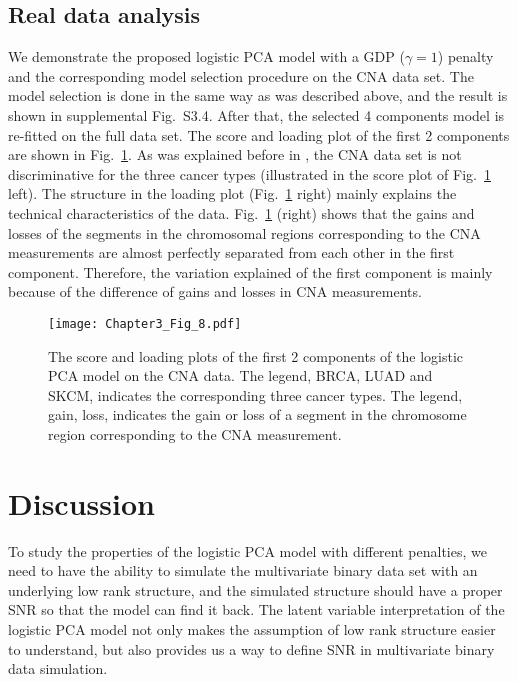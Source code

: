 \subsection{Real data analysis}
We demonstrate the proposed logistic PCA model with a GDP ($\gamma=1$) penalty and the corresponding model selection procedure on the CNA data set. The model selection is done in the same way as was described above, and the result is shown in supplemental Fig.~S3.4. After that, the selected 4 components model is re-fitted on the full data set. The score and loading plot of the first 2 components are shown in Fig.~\ref{chapter3_fig:8}. As was explained before in \cite{song2018generalized}, the CNA data set is not discriminative for the three cancer types (illustrated in the score plot of Fig.~\ref{chapter3_fig:8} left). The structure in the loading plot (Fig.~\ref{chapter3_fig:8} right) mainly explains the technical characteristics of the data. Fig.~\ref{chapter3_fig:8} (right) shows that the gains and losses of the segments in the chromosomal regions corresponding to the CNA measurements are almost perfectly separated from each other in the first component. Therefore, the variation explained of the first component is mainly because of the difference of gains and losses in CNA measurements.

\begin{figure}[htbp]
    \centering
    \texttt{[image: Chapter3\_Fig\_8.pdf]}
    \caption{The score and loading plots of the first 2 components of the logistic PCA model on the CNA data. The legend, BRCA, LUAD and SKCM, indicates the corresponding three cancer types. The legend, gain, loss, indicates the gain or loss of a segment in the chromosome region corresponding to the CNA measurement.
    }
    \label{chapter3_fig:8}
\end{figure}

\section{Discussion}
To study the properties of the logistic PCA model with different penalties, we need to have the ability to simulate the multivariate binary data set with an underlying low rank structure, and the simulated structure should have a proper SNR so that the model can find it back. The latent variable interpretation of the logistic PCA model not only makes the assumption of low rank structure easier to understand, but also provides us a way to define SNR in multivariate binary data simulation.

